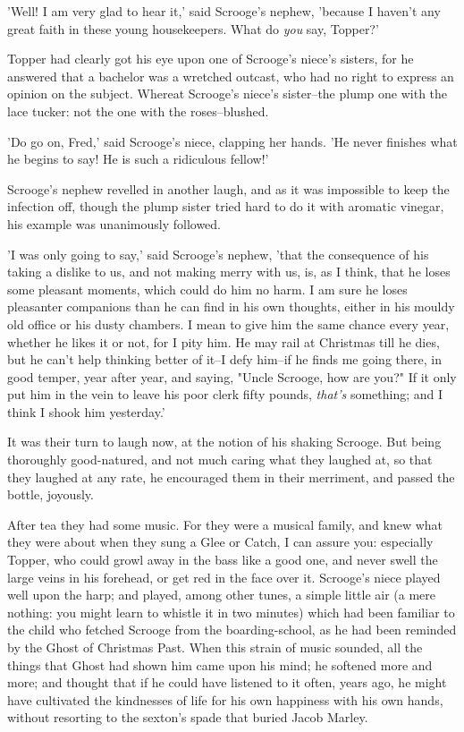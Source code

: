 'Well! I am very glad to hear it,' said Scrooge's nephew, 'because I
haven't any great faith in these young housekeepers. What do \emph{you} say,
Topper?'

Topper had clearly got his eye upon one of Scrooge's niece's sisters,
for he answered that a bachelor was a wretched outcast, who had no right
to express an opinion on the subject. Whereat Scrooge's niece's
sister--the plump one with the lace tucker: not the one with the
roses--blushed.

'Do go on, Fred,' said Scrooge's niece, clapping her hands. 'He never
finishes what he begins to say! He is such a ridiculous fellow!'

Scrooge's nephew revelled in another laugh, and as it was impossible to
keep the infection off, though the plump sister tried hard to do it with
aromatic vinegar, his example was unanimously followed.

'I was only going to say,' said Scrooge's nephew, 'that the consequence
of his taking a dislike to us, and not making merry with us, is, as I
think, that he loses some pleasant moments, which could do him no harm.
I am sure he loses pleasanter companions than he can find in his own
thoughts, either in his mouldy old office or his dusty chambers. I mean
to give him the same chance every year, whether he likes it or not, for
I pity him. He may rail at Christmas till he dies, but he can't help
thinking better of it--I defy him--if he finds me going there, in good
temper, year after year, and saying, "Uncle Scrooge, how are you?" If it
only put him in the vein to leave his poor clerk fifty pounds, \emph{that's}
something; and I think I shook him yesterday.'

It was their turn to laugh now, at the notion of his shaking Scrooge.
But being thoroughly good-natured, and not much caring what they laughed
at, so that they laughed at any rate, he encouraged them in their
merriment, and passed the bottle, joyously.

After tea they had some music. For they were a musical family, and knew
what they were about when they sung a Glee or Catch, I can assure you:
especially Topper, who could growl away in the bass like a good one, and
never swell the large veins in his forehead, or get red in the face over
it. Scrooge's niece played well upon the harp; and played, among other
tunes, a simple little air (a mere nothing: you might learn to whistle
it in two minutes) which had been familiar to the child who fetched
Scrooge from the boarding-school, as he had been reminded by the Ghost
of Christmas Past. When this strain of music sounded, all the things
that Ghost had shown him came upon his mind; he softened more and more;
and thought that if he could have listened to it often, years ago, he
might have cultivated the kindnesses of life for his own happiness with
his own hands, without resorting to the sexton's spade that buried Jacob
Marley.

